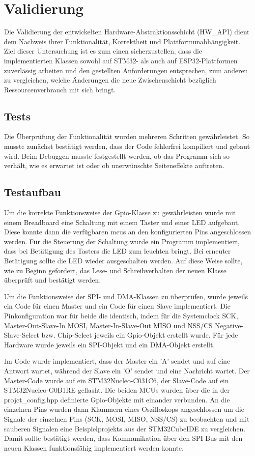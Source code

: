 \section{Validierung}
Die Validierung der entwickelten Hardware-Abstraktionsschicht (HW\_API) dient dem Nachweis ihrer Funktionalität, Korrektheit und Plattformunabhängigkeit. 
Ziel dieser Untersuchung ist es zum einen sicherzustellen, dass die implementierten Klassen sowohl auf STM32- als auch auf ESP32-Plattformen zuverlässig arbeiten und den gestellten Anforderungen entsprechen, zum anderen zu vergleichen, welche Änderungen die neue Zwischenschicht bezüglich Ressourcenverbrauch mit sich bringt.

\subsection{Tests}
Die Überprüfung der Funktionalität wurden mehreren Schritten gewährleistet.
So musste zunächst bestätigt werden, dass der Code fehlerfrei kompiliert und gebaut wird.
Beim Debuggen musste festgestellt werden, ob das Programm sich so verhält, wie es erwartet ist oder ob unerwünschte Seiteneffekte auftreten.

\subsection*{Testaufbau}
Um die korrekte Funktionsweise der Gpio-Klasse zu gewährleisten wurde mit einem Breadboard eine Schaltung mit einem Taster und einer LED aufgebaut.
Diese konnte dann die verfügbaren \gls{mcu}s an den konfigurierten Pins angeschlossen werden.
Für die Steuerung der Schaltung wurde ein Programm implementiert, dass bei Betätigung des Tasters die LED zum leuchten bringt. 
Bei erneuter Betätigung sollte die LED wieder ausgeschalten werden.
Auf diese Weise sollte, wie zu Beginn gefordert, das Lese- und Schreibverhalten der neuen Klasse überprüft und bestätigt werden.

Um die Funktionsweise der SPI- und DMA-Klassen zu überprüfen, wurde jeweils ein Code für einen Master und ein Code für einen Slave implementiert.
Die Pinkonfiguration war für beide die identisch, indem für die Systemclock SCK, Master-Out-Slave-In MOSI, Master-In-Slave-Out MISO und NSS/CS Negative-Slave-Select bzw. Chip-Select jeweils ein Gpio-Objekt erstellt wurde.
Für jede Hardware wurde jeweils ein SPI-Objekt und ein DMA-Objekt erstellt.

Im Code wurde implementiert, dass der Master ein 'A' sendet und auf eine Antwort wartet, während der Slave ein 'O' sendet und eine Nachricht wartet.
Der Master-Code wurde auf ein STM32Nucleo-C031C6, der Slave-Code auf ein STM32Nucleo-G0B1RE geflasht. 
Die beiden MCUs wurden über die in der projct\_config.hpp definierte Gpio-Objekte mit einander verbunden.
An die einzelnen Pins wurden dann Klammern eines Oszilloskops angeschlossen um die Signale der einzelnen Pins (SCK, MOSI, MISO, NSS/CS) zu beobachten und mit sauberen Signalen eine Beispielprojekts aus der STM32CubeIDE zu vergleichen.
Damit sollte bestätigt werden, dass Kommunikation über den SPI-Bus mit den neuen Klassen funktionsfähig implementiert werden konnte. 

